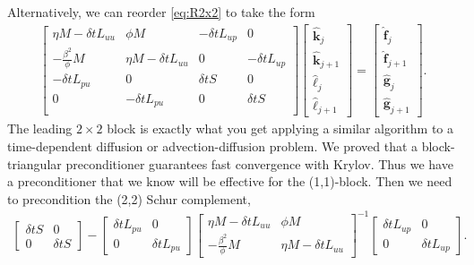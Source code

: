 \documentclass[a4paper,10pt]{article}
\begin{document}
Alternatively, we can reorder \eqref{eq:R2x2} to take the form
%
\begin{align}\label{eq:R2x2_2}
\begin{bmatrix}
	\eta M - \delta tL_{uu} & \phi M & -\delta tL_{up} & 0 \\
	-\frac{\beta^2}{\phi}M & \eta M - \delta tL_{uu} & 0 & -\delta tL_{up} \\
	-\delta tL_{pu} & 0 & \delta tS & 0 \\
	0 & -\delta tL_{pu} & 0 & \delta tS \\
	\end{bmatrix}
	\begin{bmatrix} \hat{\mathbf{k}}_j \\ \hat{\mathbf{k}}_{j+1} \\ 
		\hat{\ell}_j \\\hat{\ell}_{j+1} \end{bmatrix} =
	\begin{bmatrix} \hat{\mathbf{f}}_j \\ \hat{\mathbf{f}}_{j+1} \\
		 \hat{\mathbf{g}}_j \\ \hat{\mathbf{g}}_{j+1} \end{bmatrix}.
\end{align}
%
The leading $2\times 2$ block is exactly what you get applying a similar
algorithm to a time-dependent diffusion or advection-diffusion problem.
We proved that a block-triangular preconditioner guarantees fast convergence
with Krylov. Thus we have a preconditioner that we know will be effective
for the (1,1)-block. Then we need to precondition the (2,2) Schur complement,
%
\begin{align}\label{eq:blockS}
\begin{bmatrix} \delta tS & 0 \\ 0 & \delta tS\end{bmatrix} 
	- \begin{bmatrix} \delta tL_{pu} & 0 \\ 0 & \delta tL_{pu}\end{bmatrix}
	\begin{bmatrix} \eta M - \delta tL_{uu} & \phi M \\
		-\frac{\beta^2}{\phi}M & \eta M - \delta tL_{uu} \end{bmatrix}^{-1}
	\begin{bmatrix} \delta tL_{up} & 0 \\ 0 & \delta tL_{up} \end{bmatrix}.
\end{align}
\end{document}
